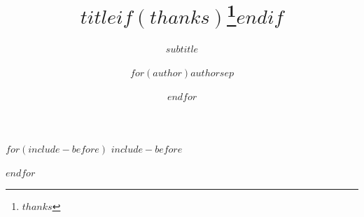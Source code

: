 \documentclass{book}
\title{$title$$if(thanks)$\thanks{$thanks$}$endif$}
\subtitle{$subtitle$}
\author{$for(author)$$author$$sep$ \and $endfor$}
\begin{document}


  $for(include-before)$
  $include-before$

  $endfor$

  \frontmatter

  \begin{figure}[p]
      \vspace*{-12mm}
      \hspace*{-12.5mm}
  \end{figure}
\end{document}

